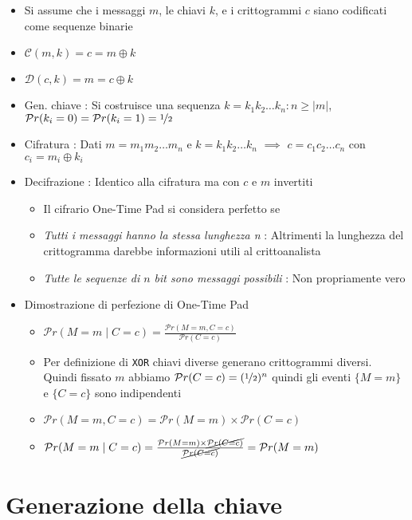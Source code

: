 \begin{itemize}
    \item Si assume che i messaggi $m$, le chiavi $k$, e i crittogrammi $c$ siano codificati come sequenze binarie
    \item $\mathcal{C}(m, k) = c = m \oplus k$
    \item $\mathcal{D}(c, k) = m = c \oplus k$
    \item Gen. chiave : Si costruisce una sequenza $k = k_1k_2\dots k_n : n \geq |m|$, $\mathcal{P}r(k_i = 0) = \mathcal{P}r(k_i = 1) = \nicefrac{1}{2}$
    \item Cifratura : Dati $m = m_1m_2\dots m_n$ e $k = k_1k_2\dots k_n$ $\implies$ $c = c_1c_2\dots c_n$ con $c_i = m_i \oplus k_i$
    \item Decifrazione : Identico alla cifratura ma con $c$ e $m$ invertiti
    \begin{itemize}
        \item Il cifrario One-Time Pad si considera perfetto se
        \item \textit{Tutti i messaggi hanno la stessa lunghezza n} : Altrimenti la lunghezza del crittogramma darebbe informazioni utili al crittoanalista
        \item \textit{Tutte le sequenze di $n$ bit sono messaggi possibili} : Non propriamente vero
    \end{itemize}
    \item Dimostrazione di perfezione di One-Time Pad
    \begin{itemize}
        \item $\mathcal{P}r(M = m \mid C = c) = \frac{\mathcal{P}r(M = m, C = c)}{\mathcal{P}r(C = c)}$
        \item Per definizione di \texttt{XOR} chiavi diverse generano crittogrammi diversi. Quindi fissato $m$ abbiamo $\mathcal{P}r(C = c) = (\nicefrac{1}{2})^n$ quindi gli eventi $\{M = m\}$ e $\{C = c\}$ sono indipendenti
        \item $\mathcal{P}r(M = m, C = c) = \mathcal{P}r(M = m) \times \mathcal{P}r(C = c)$
        \item $\mathcal{P}r(M = m \mid C = c) = \frac{\mathcal{P}r(M = m) \times \cancel{\mathcal{P}r(C = c)}}{\cancel{\mathcal{P}r(C = c)}} = \mathcal{P}r(M = m)$
    \end{itemize}
\end{itemize}

\section{Generazione della chiave}

